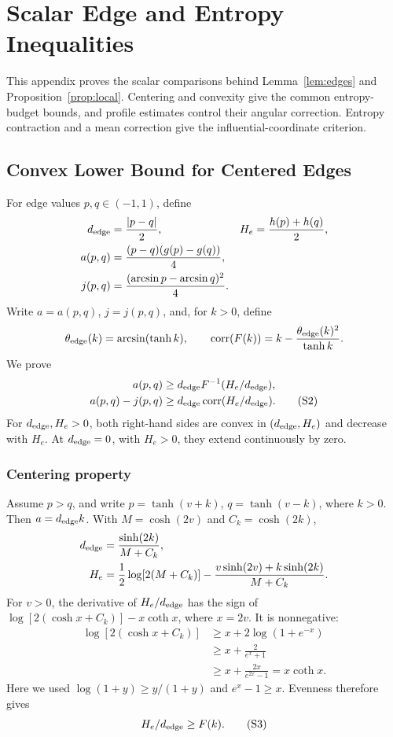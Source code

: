 \section{Scalar Edge and Entropy Inequalities}\label{app:scalar}\label{ck-the-scalar-and-edge-lemmas}

This appendix proves the scalar comparisons behind
Lemma~\ref{lem:edges} and Proposition~\ref{prop:local}.
Centering and convexity give the common entropy-budget bounds, and
profile estimates control their angular correction.
Entropy contraction and a mean correction give the
influential-coordinate criterion.

\subsection{Convex Lower Bound for Centered Edges}\label{centered-edges-give-a-convex-lower-bound}

For edge values \(p,q\in(-1,1)\), define
\begin{align*}
 d_{\mathrm{edge}}&=\frac{|p-q|}{2},& H_e&=\frac{h(p)+h(q)}2,\\
 a(p,q)&=\frac{(p-q)(g(p)-g(q))}{4},\\
 j(p,q)&=\frac{(\arcsin p-\arcsin q)^2}{4}.
\end{align*}
Write \(a=a(p,q)\), \(j=j(p,q)\), and, for \(k>0\), define
\[
 \theta_{\rm edge}(k)=\arcsin(\tanh k),\qquad
 \operatorname{corr}(F(k))=k-\frac{\theta_{\rm edge}(k)^2}{\tanh k}.
\]
We prove
\begin{align}
 a(p,q)&\ge d_{\mathrm{edge}} F^{-1}(H_e/d_{\mathrm{edge}}),\nonumber\\
 a(p,q)-j(p,q)&\ge d_{\mathrm{edge}}\operatorname{corr}(H_e/d_{\mathrm{edge}}).
 \tag{S2}\label{eq:scalar-S2}
\end{align}
For \(d_{\mathrm{edge}},H_e>0\), both right-hand sides are convex in
\((d_{\mathrm{edge}},H_e)\) and decrease with \(H_e\). At
\(d_{\mathrm{edge}}=0\), with \(H_e>0\), they extend continuously by zero.

\subsubsection{Centering property}\label{why-centering-the-edge-helps}

Assume \(p>q\), and write \(p=\tanh(v+k)\), \(q=\tanh(v-k)\),
where \(k>0\). Then \(a=d_{\mathrm{edge}} k\). With
\(M=\cosh(2v)\) and \(C_k=\cosh(2k)\),
\begin{align*}
 d_{\mathrm{edge}}&=\frac{\sinh(2k)}{M+C_k},\\
 H_e&=\frac12\log[2(M+C_k)]
       -\frac{v\sinh(2v)+k\sinh(2k)}{M+C_k}.
\end{align*}
For \(v>0\), the derivative of \(H_e/d_{\mathrm{edge}}\) has the sign of
\(\log[2(\cosh x+C_k)]-x\coth x\), where \(x=2v\). It is nonnegative:
\begin{align*}
 \log[2(\cosh x+C_k)]
 &\ge x+2\log(1+e^{-x})\\
 &\ge x+\frac2{e^x+1}\\
 &\ge x+\frac{2x}{e^{2x}-1}=x\coth x.
\end{align*}
Here we used \(\log(1+y)\ge y/(1+y)\) and \(e^x-1\ge x\).
Evenness therefore gives
\[
                         H_e/d_{\mathrm{edge}} \ge F(k).               \tag{S3}\label{eq:scalar-S3}
\]

